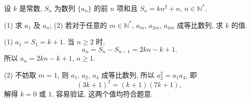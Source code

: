 \begin{exercise}
    设 $k$ 是常数, $S_n$ 为数列 $\{a_n\}$ 的前 $n$ 项和且 $S_n=kn^2+n$, $n\in\mathbb{N}^*$.
    
    (1) 求 $a_1$ 及 $a_n$;\qquad
    (2) 若对于任意的 $m\in\mathbb{N}^*$, $a_m$, $a_{2m}$, $a_{4m}$ 成等比数列, 求 $k$ 的值.
\end{exercise}
\beginsolution
    (1) $a_1= S_1= k+1$. 当 $n\geqslant 2$ 时,
    \[a_n= S_n-S_{n-1}= 2kn-k+1.\]
    所以 $a_n= 2kn-k+1$, $n\geqslant 1$.

    (2) 不妨取 $m=1$, 则 $a_1$, $a_2$, $a_4$ 成等比数列, 所以 $a_2^2= a_1a_4$, 即
    \[(3k+1)^2= (k+1)(7k+1),\]
    解得 $k=0$ 或 $1$. 容易验证, 这两个值均符合题意.
\endsolution
